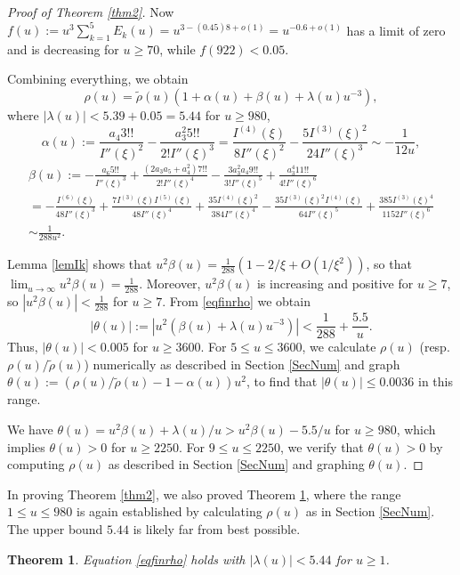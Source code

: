 \documentclass[11pt]{amsart}
\newtheorem{theorem}{Theorem}
\begin{document}
\begin{proof}[Proof of Theorem \ref{thm2}]
Now $f(u):=u^3\sum_{k=1}^5 E_k(u)=u^{3-(0.45)8+o(1)}=u^{-0.6+o(1)}$ has a limit of zero and is decreasing for $u\ge 70$, while 
$f(922)<0.05$. 

Combining everything, we obtain 
\begin{equation}\label{eqfinrho}
\rho(u) = \tilde{\rho}(u) \left(1+\alpha(u) +\beta(u)+\lambda(u) u^{-3}\right),
\end{equation}
where $|\lambda(u)|<5.39 + 0.05 =5.44$ for $u\ge 980$,
$$
\alpha(u) := \frac{a_4 3!!}{I''(\xi)^2} - \frac{a_3^2 5!!}{2! I''(\xi)^3}=\frac{I^{(4)}(\xi)}{8 I''(\xi)^2}-\frac{5 I^{(3)}(\xi)^2}{24 I''(\xi)^3}
\sim -\frac{1}{12u},
$$
\begin{multline*}
\beta(u):=-\frac{a_6 5!!}{I''(\xi)^3}+\frac{(2 a_3 a_5 + a_4^2) 7!!}{2! I''(\xi)^4}- \frac{3a_3^2 a_4 9!!}{3! I''(\xi)^5}
+\frac{a_3^4 11!!}{4! I''(\xi)^6}\\
=
-\frac{I^{(6)}(\xi)}{48 I''(\xi)^3}
+\frac{7 I^{(3)}(\xi) I^{(5)}(\xi)}{48  I''(\xi)^4}
+\frac{35 I^{(4)}(\xi)^2}{384 I''(\xi)^4}
-\frac{35 I^{(3)}(\xi)^2 I^{(4)}(\xi)}{64 I''(\xi)^5}
+\frac{385 I^{(3)}(\xi)^4}{1152 I''(\xi)^6}\\
 \sim \frac{1}{288 u^2}.
\end{multline*}

Lemma \ref{lemIk} shows that $u^2 \beta(u)=  \frac{1}{288}(1-2/\xi +O(1/\xi^2))$,
so that $\lim_{u\to \infty} u^2 \beta(u) = \frac{1}{288}$. Moreover, $u^2 \beta(u)$ is increasing and positive for $u\ge 7$,
so $|u^2 \beta(u) |< \frac{1}{288}$ for $u\ge 7$. 
From \eqref{eqfinrho} we obtain
$$|\theta(u)|:= |u^2(\beta(u) + \lambda(u) u^{-3}) | <\frac{1}{288} + \frac{5.5}{u}.$$
Thus, $|\theta(u)|<0.005$ for $u\ge 3600$. 
For $5\le u \le 3600$, we calculate $\rho(u)$ (resp. $\rho(u)/\tilde{\rho}(u)$) numerically as described in Section \ref{SecNum} and graph
$\theta(u):= (\rho(u)/\tilde{\rho}(u) -1-\alpha(u)) u^2$, to find that $|\theta(u)|\le 0.0036$ in this range.

We have $\theta(u)=u^2\beta(u) +\lambda(u)/u >u^2\beta(u)-5.5/u$ for $u\ge 980$, which implies $\theta(u)>0$ for $u\ge 2250$. 
For $9\le u\le 2250$, we verify that $\theta(u)>0$ by computing $\rho(u)$ as described in Section \ref{SecNum} and graphing $\theta(u)$. 
\end{proof}

In proving Theorem \ref{thm2}, we also proved Theorem \ref{thm3}, where the range $1\le u\le 980$ is again 
established by calculating $\rho(u)$ as in Section \ref{SecNum}. The upper bound $5.44$ is likely far from best possible.
\begin{theorem}\label{thm3}
Equation \eqref{eqfinrho} holds with $|\lambda(u)|<5.44$ for $u\ge 1$. 
\end{theorem}
\end{document}
